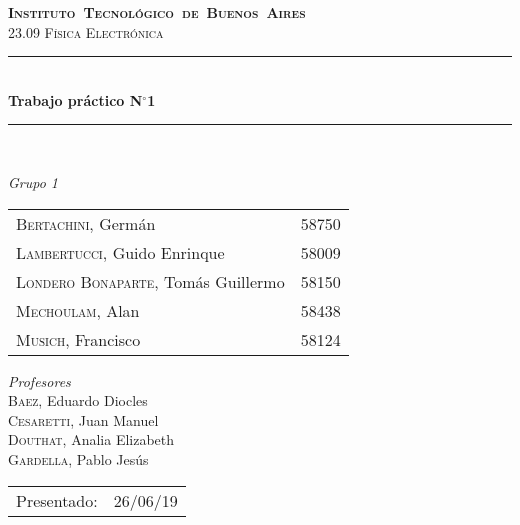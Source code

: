 \begin{titlepage}
\newcommand{\HRule}{\rule{\linewidth}{0.5mm}}
\center
\mbox{\textsc{\LARGE \bfseries {Instituto Tecnológico de Buenos Aires}}}\\[1.5cm]
\textsc{\Large 23.09 Física Electrónica}\\[0.5cm]

\HRule \\[0.6cm]
{ \Huge \bfseries Trabajo práctico N$^{\circ}$1}\\[0.4cm] 
\HRule \\[1.5cm]


{\large

\emph{Grupo 1}\\
\vspace{3px}

\begin{tabular}{lr}
\textsc{Bertachini}, Germán  & 58750 \\ 	
\textsc{Lambertucci}, Guido Enrinque  & 58009 \\
\textsc{Londero Bonaparte}, Tomás Guillermo  & 58150 \\
\textsc{Mechoulam}, Alan  &  58438\\
\textsc{Musich}, Francisco  & 58124 \\

\end{tabular}

\vspace{20px}

\emph{Profesores}\\
\vspace{3px}
\textsc{Baez}, Eduardo Diocles\\ 	
\textsc{Cesaretti}, Juan Manuel\\ 
\textsc{Douthat}, Analia Elizabeth\\ 
\textsc{Gardella}, Pablo Jesús\\ 	

\vspace{100px}

\begin{tabular}{ll}

Presentado: & 26/06/19\\

\end{tabular}

}

\vfill

\end{titlepage}
